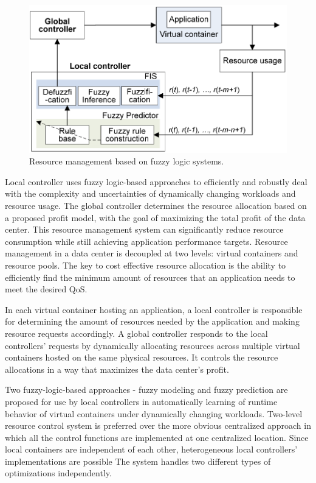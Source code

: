 \documentclass[conference]{IEEEtran}
\begin{document}
\begin{figure}[h!]
  \centering
   \includegraphics[scale=0.30]{fuzzy_block_dia.png}
  \caption{Resource management based on fuzzy logic systems.}
\end{figure}

Local controller uses fuzzy logic-based approaches to efficiently and robustly deal with the complexity and uncertainties of dynamically
changing workloads and resource usage. The global controller
determines the resource allocation based on a proposed
profit model, with the goal of maximizing the total
profit of the data center. This resource
management system can significantly reduce resource consumption
while still achieving application performance targets. Resource
management in a data center is decoupled at two levels:
virtual containers and resource pools. The key to cost effective
resource allocation is the ability to efficiently find
the minimum amount of resources that an application needs
to meet the desired QoS.





In each virtual container hosting an
application, a local controller is responsible for determining
the amount of resources needed by the application and making
resource requests accordingly. A global controller responds
to the local controllers’ requests by dynamically allocating
resources across multiple virtual containers hosted
on the same physical resources. It controls the resource allocations
in a way that maximizes the data center’s profit.




Two fuzzy-logic-based approaches - fuzzy modeling and
fuzzy prediction are proposed for use by local controllers
in automatically learning of runtime behavior of virtual containers
under dynamically changing workloads. Two-level resource control system is preferred over
the more obvious centralized approach in which all the control
functions are implemented at one centralized location.
Since local containers are independent of each other, heterogeneous
local controllers’ implementations are possible
The system handles two different types of
optimizations independently. 
\end{document}
